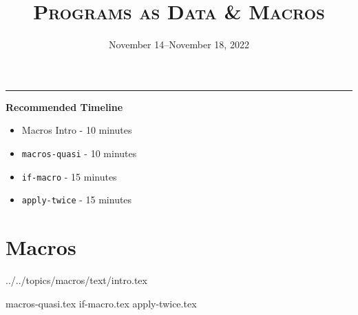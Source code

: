 \documentclass{exam}
\title{\textsc{Programs as Data \& Macros}}
\date{November 14--November 18, 2022}
\begin{document}
\maketitle
\rule{\textwidth}{0.15em}

\begin{guide}
\begin{blocksection}
    \textbf{Recommended Timeline}
    \begin{itemize}
        \item Macros Intro - 10 minutes
        \item \lstinline{macros-quasi} - 10 minutes
        \item \lstinline{if-macro} - 15 minutes
        \item \lstinline{apply-twice} - 15 minutes
    \end{itemize}
\end{blocksection}
\newpage
\end{guide}

\section{Macros}
 {../../topics/macros/text/}{intro.tex}
\begin{questions}
{macros-quasi.tex}
{if-macro.tex}
{apply-twice.tex}
\end{questions}
\end{document}
